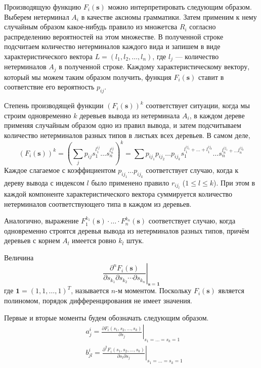 \documentclass[12pt]{article}
\renewcommand{\leq}{\leqslant}
\begin{document}
Производящую функцию $F_i(\mathbf{s})$ можно интерпретировать следующим образом. Выберем нетерминал $A_i$ в качестве аксиомы грамматики. Затем применим к нему случайным образом какое-нибудь правило из множетсва $R_i$ согласно распределению вероятностей на этом множестве. В полученной строке подсчитаем количество нетерминалов каждого вида и запишем в виде характеристического вектора $L = (l_1, l_2, \ldots, l_n)$, где $l_j$ --- количество нетерминалов $A_j$ в полученной строке. Каждому характеристическому вектору, который мы можем таким образом получить, функция $F_i(\mathbf{s})$ ставит в соответствие его вероятность $p_{ij}$.

Степень производящей функции $(F_i(\mathbf{s}))^k$ соответствует ситуации, когда мы строим одновременно $k$ деревьев вывода из нетерминала $A_i$, в каждом дереве применяя случайным образом одно из правил вывода, и затем подсчитываем количество нетерминалов разных типов в листьях всех деревьев. В самом деле,
\begin{equation}
\label{eq:f-powers}
	(F_i(\mathbf{s}))^k = \left( \sum_j p_{ij} s_1^{l^{ij}_1} \ldots s_n^{l^{ij}_n} \right)^k = \sum p_{ij_1} p_{ij_2} \ldots p_{ij_k} s_1^{l^{ij_1}_1 + \ldots + l^{ij_k}_1} \ldots s_n^{l^{ij_1}_n + \ldots l^{ij_k}_n}
\end{equation}
Каждое слагаемое с коэффициентом $p_{ij_1} \ldots p_{ij_k}$ соответствует случаю, когда к дереву вывода с индексом $l$ было применено правило $r_{ij_l}$ ($1 \leq l \leq k$). При этом в каждой компоненте характеристического вектора суммируется количество нетерминалов соответствующего типа в каждом из деревьев.

Аналогично, выражение $F_1^{k_1}(\mathbf{s}) \cdot \ldots \cdot F_n^{k_n}(\mathbf{s})$ соответствует случаю, когда одновременно строятся деревья вывода из нетерминалов разных типов, причём деревьев с корнем $A_l$ имеется ровно $k_l$ штук.

Величина
\begin{equation*}
	\left.\frac{\partial^n F_i(\mathbf{s})}{\partial s_{k_1} \partial s_{k_2} \cdots \partial s_{k_n}}\right|_{\mathbf{s} = \mathbf{1}}
\end{equation*}
где $\mathbf{1} = (1, 1, \ldots, 1)^T$, называется $n$-м моментом. Поскольку $F_i(\mathbf{s})$ является полиномом, порядок дифференцирования не имеет значения.

Первые и вторые моменты будем обозначать следующим образом.
\begin{equation}
\label{eq:aij-bij-definition}
\begin{split}
	&a^i_j  = \left. \frac{\partial F_i(s_1, s_2, \ldots, s_k)}{\partial s_j} \right|_{s_1 = \ldots = s_k = 1} \\
	&b^i_{jl} = \left. \frac{\partial^2 F_i(s_1, s_2, \ldots, s_k)}{\partial s_l \partial s_j} \right|_{s_1 = \ldots = s_k = 1}
\end{split}
\end{equation}
\end{document}
